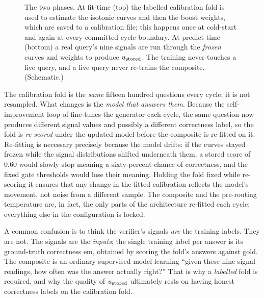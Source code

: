 \begin{figure}[htbp]
{}
\caption[Fit-time versus predict-time]{The two phases. At fit-time (top) the labelled
calibration fold is used to estimate the isotonic curves and then the boost weights,
which are saved to a calibration file; this happens once at cold-start and again at
every committed cycle boundary. At predict-time (bottom) a real query's nine signals
are run through the \emph{frozen} curves and weights to produce $u_{\text{stored}}$. The
training never touches a live query, and a live query never re-trains the composite. (Schematic.)}
\label{fig:composite-train}
\end{figure}

\begin{precise}
The calibration fold is the \emph{same} fifteen hundred questions every cycle; it is
not resampled. What changes is the \emph{model that answers them}. Because the
self-improvement loop of  fine-tunes the generator each cycle, the same
question now produces different signal values and possibly a different correctness
label, so the fold is \emph{re-scored} under the updated model before the composite is
re-fitted on it. Re-fitting is necessary precisely because the model drifts: if the
curves stayed frozen while the signal distributions shifted underneath them, a stored
score of $0.60$ would slowly stop meaning a sixty-percent chance of correctness, and
the fixed gate thresholds would lose their meaning. Holding the fold fixed while
re-scoring it ensures that any change in the fitted calibration reflects the model's
movement, not noise from a different sample. The composite and the pre-routing
temperature are, in fact, the only parts of the architecture re-fitted each cycle;
everything else in the configuration is locked.
\end{precise}

\begin{pitfall}
A common confusion is to think the verifier's signals \emph{are} the training labels.
They are not. The signals are the \emph{inputs}; the single training label per answer
is its ground-truth correctness $\mathrm{em}$, obtained by scoring the fold's answers
against gold. The composite is an ordinary supervised model learning ``given these
nine signal readings, how often was the answer actually right?'' That is why a
\emph{labelled} fold is required, and why the quality of $u_{\text{stored}}$ ultimately rests
on having honest correctness labels on the calibration fold.
\end{pitfall}

